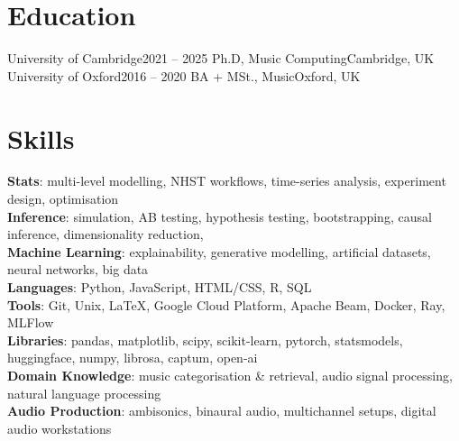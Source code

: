 \documentclass[letterpaper,11pt]{article}
\begin{document}
\section{Education}
  \resumeSubHeadingListStart
    \resumeSubheading
      {University of Cambridge}{2021 -- 2025}
      {Ph.D, Music Computing}{Cambridge, UK}
      \resumeItemListStart
      \resumeItemListEnd
    \resumeSubheading
      {University of Oxford}{2016 -- 2020}
      {BA + MSt., Music}{Oxford, UK}
      \resumeItemListStart
      \resumeItemListEnd
  \resumeSubHeadingListEnd

\section{Skills}
 \begin{itemize}[leftmargin=0.15in, label={}]
    \small{\item{
     \textbf{Stats}{: multi-level modelling, NHST workflows, time-series analysis, experiment design, optimisation} \\
     \textbf{Inference}{: simulation, AB testing, hypothesis testing, bootstrapping, causal inference, dimensionality reduction,} \\
     \textbf{Machine Learning}{: explainability, generative modelling, artificial datasets, neural networks, big data} \\
     \textbf{Languages}{: Python, JavaScript, HTML/CSS, R, SQL} \\
     \textbf{Tools}{: Git, Unix, \LaTeX, Google Cloud Platform, Apache Beam, Docker, Ray, MLFlow} \\
     \textbf{Libraries}{: pandas, matplotlib, scipy, scikit-learn, pytorch, statsmodels, huggingface, numpy, librosa, captum, open-ai} \\
     \textbf{Domain Knowledge}{: music categorisation \& retrieval, audio signal processing, natural language processing} \\
    \textbf{Audio Production}{: ambisonics, binaural audio, multichannel setups, digital audio workstations}
    }}
 \end{itemize}
\end{document}
